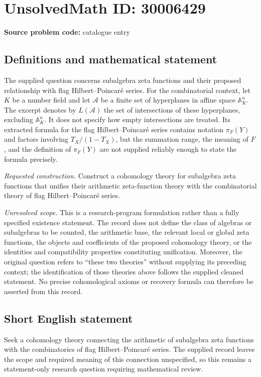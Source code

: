 \documentclass[11pt]{article}
\begin{document}
\section*{UnsolvedMath ID: 30006429}
\textbf{Source problem code:} catalogue entry
\subsection{Definitions and mathematical statement}
The supplied question concerns subalgebra zeta functions and their proposed relationship with flag Hilbert--Poincar\'e series. For the combinatorial context, let \(K\) be a number field and let \(\mathcal A\) be a finite set of hyperplanes in affine space \(\mathbb A^n_K\). The excerpt denotes by \(L(\mathcal A)\) the set of intersections of these hyperplanes, excluding \(\mathbb A^n_K\). It does not specify how empty intersections are treated. Its extracted formula for the flag Hilbert--Poincar\'e series contains notation \(\pi_F(Y)\) and factors involving \(T_X/(1-T_X)\), but the summation range, the meaning of \(F\), and the definition of \(\pi_F(Y)\) are not supplied reliably enough to state the formula precisely.

\emph{Requested construction.} Construct a cohomology theory for subalgebra zeta functions that unifies their arithmetic zeta-function theory with the combinatorial theory of flag Hilbert--Poincar\'e series.

\emph{Unresolved scope.} This is a research-program formulation rather than a fully specified existence statement. The record does not define the class of algebras or subalgebras to be counted, the arithmetic base, the relevant local or global zeta functions, the objects and coefficients of the proposed cohomology theory, or the identities and compatibility properties constituting unification. Moreover, the original question refers to ``these two theories'' without supplying its preceding context; the identification of those theories above follows the supplied cleaned statement. No precise cohomological axioms or recovery formula can therefore be asserted from this record.
\subsection{Short English statement}
Seek a cohomology theory connecting the arithmetic of subalgebra zeta functions with the combinatorics of flag Hilbert--Poincar\'e series. The supplied record leaves the scope and required meaning of this connection unspecified, so this remains a statement-only research question requiring mathematical review.
\end{document}
